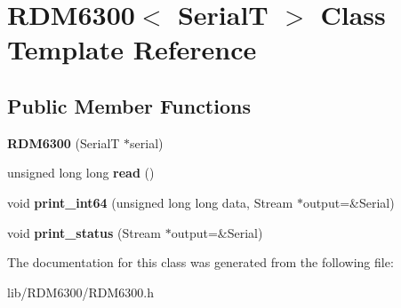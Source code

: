 \hypertarget{class_r_d_m6300}{}\section{R\+D\+M6300$<$ SerialT $>$ Class Template Reference}
\label{class_r_d_m6300}
\subsection*{Public Member Functions}
\begin{DoxyCompactItemize}
\item 
\mbox{\label{class_r_d_m6300_a13ba7af7b769daa17b79f93d07f27d0c}} 
{\bfseries R\+D\+M6300} (SerialT $\ast$serial)
\item 
\mbox{\label{class_r_d_m6300_aef0244df73d0de0ac0bdb0744ee26a57}} 
unsigned long long {\bfseries read} ()
\item 
\mbox{\label{class_r_d_m6300_af4c84b18885fb88995a9b32c8486a876}} 
void {\bfseries print\+\_\+int64} (unsigned long long data, Stream $\ast$output=\&Serial)
\item 
\mbox{\label{class_r_d_m6300_ab29948e869d39bcfbcfc291cfeb35d3a}} 
void {\bfseries print\+\_\+status} (Stream $\ast$output=\&Serial)
\end{DoxyCompactItemize}


The documentation for this class was generated from the following file\+:\begin{DoxyCompactItemize}
\item 
lib/\+R\+D\+M6300/R\+D\+M6300.\+h\end{DoxyCompactItemize}
